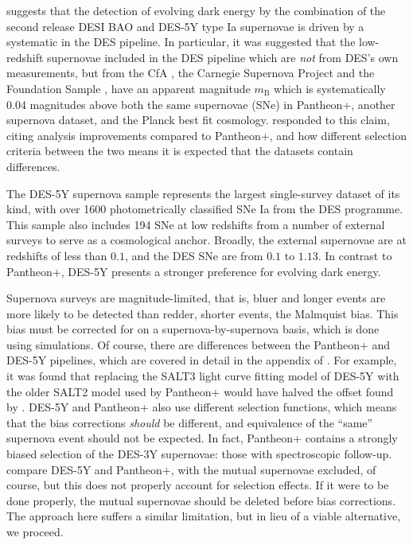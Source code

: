 \documentclass[fleqn,usenatbib]{mnras}
\begin{document}
    \cite{georgedes5y} suggests that the detection of evolving dark energy by the combination of the second release DESI BAO and DES-5Y type Ia supernovae is driven by a systematic in the DES pipeline.
    In particular, it was suggested that the low-redshift supernovae included in the DES pipeline which are \textit{not} from DES's own measurements, but from the CfA \citep{Hicken2009, Hicken2012}, the Carnegie Supernova Project \citep{Krisciunas2017, Krisciunas2020} and the Foundation Sample \citep{foundation}, have an apparent magnitude $m_\mathrm B$ which is systematically 0.04 magnitudes above both the same supernovae (SNe) in Pantheon+, another supernova dataset, and the Planck best fit cosmology. 
    \cite{vincenzi} responded to this claim, citing analysis improvements compared to Pantheon+, and how different selection criteria between the two means it is expected that the datasets contain differences. 

    The DES-5Y supernova sample represents the largest single-survey dataset of its kind, with over 1600 photometrically classified SNe Ia from the DES programme.
    This sample also includes 194 SNe at low redshifts from a number of external surveys to serve as a cosmological anchor.
    Broadly, the external supernovae are at redshifts of less than $0.1$, and the DES SNe are from $0.1$ to $1.13$.
    In contrast to Pantheon+, DES-5Y presents a stronger preference for evolving dark energy.

    Supernova surveys are magnitude-limited, that is, bluer and longer events are more likely to be detected than redder, shorter events, the Malmquist bias.
    This bias must be corrected for on a supernova-by-supernova basis, which is done using simulations.
    Of course, there are differences between the Pantheon+ and DES-5Y pipelines, which are covered in detail in the appendix of \cite{vincenzi}.
    For example, it was found that replacing the \textsc{SALT3} light curve fitting model \citep{Kenworthy2021, taylor2023} of DES-5Y with the older \textsc{SALT2} \citep{salt2} model used by Pantheon+ would have halved the offset found by \cite{georgedes5y}.
    DES-5Y and Pantheon+ also use different selection functions, which means that the bias corrections \textit{should} be different, and equivalence of the ``same'' supernova event should not be expected. In fact, Pantheon+ contains a strongly biased selection of the DES-3Y supernovae: those with spectroscopic follow-up.
    \cite{baovssnevidence} compare DES-5Y and Pantheon+, with the mutual supernovae excluded, of course, but this does not properly account for selection effects. If it were to be done properly, the mutual supernovae should be deleted before bias corrections.
    The approach here suffers a similar limitation, but in lieu of a viable alternative, we proceed.
\end{document}
